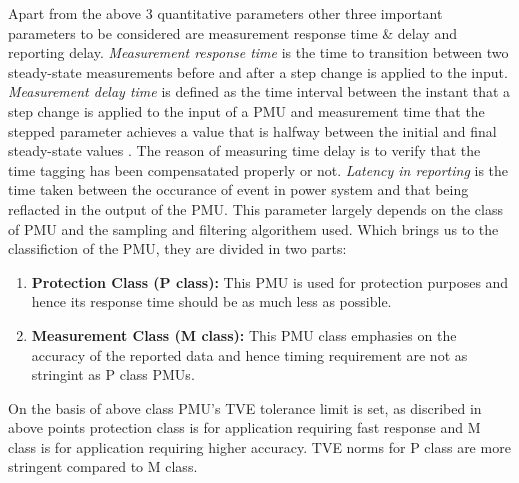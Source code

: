 Apart from the above 3 quantitative parameters other three important parameters to be considered are measurement response time \& delay and reporting delay. \textit{Measurement response time} is the time to transition between two steady-state measurements before and after a step change is applied to the input. \textit{Measurement delay time} is defined as the time interval between the instant that a step change is applied to the input of a PMU and measurement time that the stepped parameter achieves a value that is halfway between the initial and final steady-state values \cite{std:c37}. The reason of measuring time delay is to verify that the time tagging has been compensatated properly or not.  \textit{Latency in reporting} is the time taken between the occurance of event in power system and that being reflacted in the output of the PMU. This parameter largely depends on the class of PMU and the sampling and filtering algorithem used. Which brings us to the classifiction of the PMU, they are divided in two parts:
\begin{enumerate}
\item \textbf{Protection Class (P class):} This PMU is used for protection purposes and hence its response time should be as much less as possible.
\item \textbf{Measurement Class (M class):}  This PMU class emphasies on the accuracy of the reported data and hence timing requirement are not as stringint as P class PMUs.
\end{enumerate} 

On the basis of above class PMU's TVE tolerance limit is set, as discribed in above points protection class is for application requiring fast response and M class is for application requiring higher accuracy. TVE norms for P class are more stringent compared to M class. 

